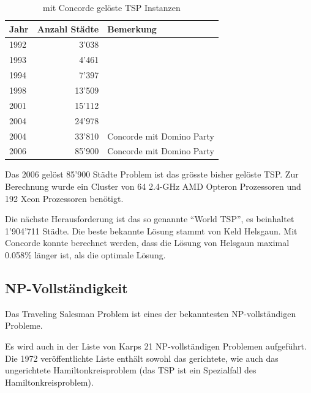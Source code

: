 \documentclass[11pt,a4paper]{article}
\begin{document}
        \begin{table}[H]
                \centering
                \begin{tabular}{| l | r | l |}
                    \hline
                        Jahr    & Anzahl Städte & Bemerkung                 \\ \hline
                        1992    & 3'038         &                           \\ \hline
                        1993    & 4'461         &                           \\ \hline
                        1994    & 7'397         &                           \\ \hline
                        1998    & 13'509        &                           \\ \hline
                        2001    & 15'112        &                           \\ \hline
                        2004    & 24'978        &                           \\ \hline
                        2004    & 33'810        & Concorde mit Domino Party \\ \hline
                        2006    & 85'900        & Concorde mit Domino Party \\ \hline
                \end{tabular}
                \caption{mit Concorde gelöste TSP Instanzen}
                \label{tab:concorde_history}
        \end{table}

Das 2006 gelöst 85'900 Städte Problem ist das grösste bisher gelöste TSP. Zur Berechnung wurde ein Cluster von 64 2.4-GHz AMD Opteron Prozessoren und 192 Xeon Prozessoren benötigt.

Die nächste Herausforderung ist das so genannte "`World TSP"', es beinhaltet 1'904'711 Städte. Die beste bekannte Lösung stammt von Keld Helsgaun. Mit Concorde konnte berechnet werden, dass die Lösung von Helsgaun maximal 0.058\% länger ist, als die optimale Lösung.

\newpage

\subsection{NP-Vollständigkeit}
Das Traveling Salesman Problem ist eines der bekanntesten NP-vollständigen Probleme. 

Es wird auch in der Liste von Karps 21 NP-vollständigen Problemen aufgeführt. Die 1972 veröffentlichte Liste\cite{karp72} enthält sowohl das gerichtete, wie auch das ungerichtete Hamiltonkreisproblem (das TSP ist ein Spezialfall des Hamiltonkreisproblem). 
\end{document}
